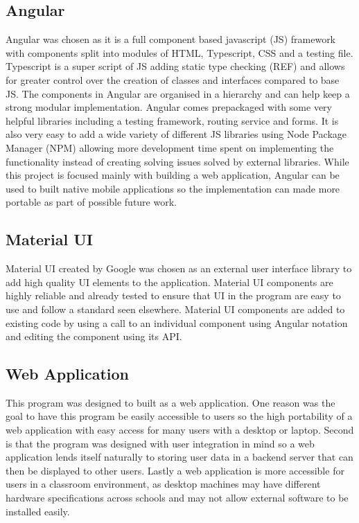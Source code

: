 \documentclass{l4proj}
\begin{document}
\subsection{Angular}
Angular was chosen as it is a full component based javascript (JS) framework with components split into modules of HTML, Typescript, CSS and a testing file. Typescript is a super script of JS adding static type checking (REF) and allows for greater control over the creation of classes and interfaces compared to base JS. The components in Angular are organised in a hierarchy and can help keep a strong modular implementation. Angular comes prepackaged with some very helpful libraries including a testing framework, routing service and forms. It is also very easy to add a wide variety of different JS libraries using Node Package Manager (NPM) allowing more development time spent on implementing the functionality instead of creating solving issues solved by external libraries. While this project is focused mainly with building a web application, Angular can be used to built native mobile applications so the implementation can made more portable as part of possible future work.

\subsection{Material UI}
Material UI created by Google was chosen as an external user interface library to add high quality UI elements to the application. Material UI components are highly reliable and already tested to ensure that UI in the program are easy to use and follow a standard seen elsewhere. Material UI components are added to existing code by using a call to an individual component using Angular notation and editing the component using its API.

\subsection{Web Application}
This program was designed to built as a web application. One reason was the goal to have this program be easily accessible to users so the high portability of a web application with easy access for many users with a desktop or laptop. Second is that the program was designed with user integration in mind so a web application lends itself naturally to storing user data in a backend server that can then be displayed to other users. Lastly a web application is more accessible for users in a classroom environment, as desktop machines may have different hardware specifications across schools and may not allow external software to be installed easily.
\end{document}
